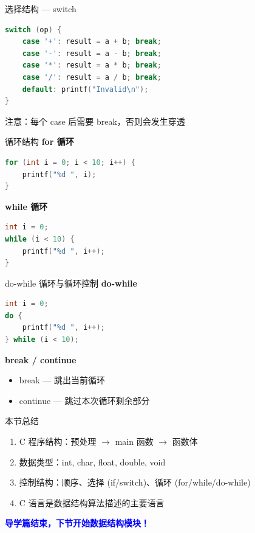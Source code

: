 \documentclass[10pt, aspectratio=169]{beamer}
\begin{document}
\begin{frame}[fragile]{选择结构 --- switch}
    \begin{lstlisting}[language=C, basicstyle=\ttfamily\small]
switch (op) {
    case '+': result = a + b; break;
    case '-': result = a - b; break;
    case '*': result = a * b; break;
    case '/': result = a / b; break;
    default: printf("Invalid\n");
}
    \end{lstlisting}
    \vspace{0.3em}
    注意：每个 case 后需要 break，否则会发生穿透
\end{frame}

\begin{frame}[fragile]{循环结构}
    \textbf{for 循环}
    \begin{lstlisting}[language=C, basicstyle=\ttfamily\small]
for (int i = 0; i < 10; i++) {
    printf("%d ", i);
}
    \end{lstlisting}
    \vspace{0.3em}
    \textbf{while 循环}
    \begin{lstlisting}[language=C, basicstyle=\ttfamily\small]
int i = 0;
while (i < 10) {
    printf("%d ", i++);
}
    \end{lstlisting}
\end{frame}

\begin{frame}[fragile]{do-while 循环与循环控制}
    \textbf{do-while}
    \begin{lstlisting}[language=C, basicstyle=\ttfamily\small]
int i = 0;
do {
    printf("%d ", i++);
} while (i < 10);
    \end{lstlisting}
    \vspace{0.3em}
    \textbf{break / continue}
    \begin{itemize}
        \item break --- 跳出当前循环
        \item continue --- 跳过本次循环剩余部分
    \end{itemize}
\end{frame}

\begin{frame}{本节总结}
    \begin{enumerate}
        \item C 程序结构：预处理 $\to$ main 函数 $\to$ 函数体
        \item 数据类型：int, char, float, double, void
        \item 控制结构：顺序、选择 (if/switch)、循环 (for/while/do-while)
        \item C 语言是数据结构算法描述的主要语言
    \end{enumerate}
    \vspace{1em}
    \begin{center}
        \textcolor{blue}{\textbf{导学篇结束，下节开始数据结构模块！}}
    \end{center}
\end{frame}
\end{document}
